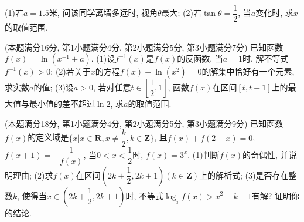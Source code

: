 \documentclass[10pt,a4paper]{article}
\begin{document}
(1)若$a=1.5$米, 问该同学离墙多远时, 视角$\theta$最大;
(2)若$\tan \theta =\dfrac 12$, 当$a$变化时, 求$x$的取值范围.
\item (本题满分16分, 第1小题满分4分, 第2小题满分5分, 第3小题满分7分)
已知函数$f(x)=\ln (x^{-1}+a)$.
(1)设$f^{-1}(x)$是$f(x)$的反函数. 当$a=1$时, 解不等式$f^{-1}(x)>0$;
(2)若关于$x$的方程$f(x)+\ln (x^2)=0$的解集中恰好有一个元素, 求实数$a$的值;
(3)设$a>0$, 若对任意$t\in [\dfrac 12,1]$, 函数$f(x)$在区间$[t,t+1]$上的最大值与最小值的差不超过$\ln 2$, 求$a$的取值范围.
\item (本题满分18分, 第1小题满分4分, 第2小题满分5分, 第3小题满分9分)
已知函数$f(x)$的定义域是$\{x|x\in \mathbf{R},x\ne \dfrac k2,k\in \mathbf{Z}\}$, 且$f(x)+f(2-x)=0$,
$f(x+1)=-\dfrac 1{f(x)}$, 当$0<x<\dfrac 12$时, $f(x)=3^x$.
(1)判断$f(x)$的奇偶性, 并说明理由;
(2)求$f(x)$在区间$(2k+\dfrac 12,2k+1)(k\in \mathbf{Z})$上的解析式;
(3)是否存在整数$k$, 使得当$x\in (2k+\dfrac 12,2k+1)$时, 不等式$\log__3f(x)>x^2-k-1$有解?
证明你的结论.






































\fi
\end{document}
